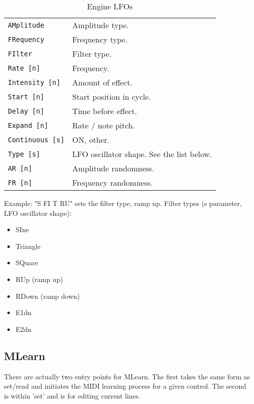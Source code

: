    \begin{table}[H]
      \centering
      \caption{Engine LFOs}
      \label{table:yoshimi_engine_lfos}
      \begin{tabular}{l l}

\texttt{AMplitude} &
   Amplitude type. \\
\texttt{FRequency} &
   Frequency type. \\
\texttt{FIlter} &
   Filter type. \\
\texttt{Rate [n]} &
   Frequency. \\
\texttt{Intensity [n]} &
   Amount of effect. \\
\texttt{Start [n]} &
   Start position in cycle. \\
\texttt{Delay [n]} &
   Time before effect. \\
\texttt{Expand [n]} &
   Rate / note pitch. \\
\texttt{Continuous [s]} &
   ON, other. \\
\texttt{Type [s]} &
   LFO oscillator shape. See the list below. \\
\texttt{AR [n]} &
   Amplitude randomness. \\
\texttt{FR [n]} &
   Frequency randomness. \\

      \end{tabular}
   \end{table}

Example: "S FI T RU" sets the filter type, ramp up.
Filter types (s parameter, LFO oscillator shape):

   \begin{itemize}
      \item SIne
      \item Triangle
      \item SQuare
      \item RUp (ramp up)
      \item RDown (ramp down)
      \item E1dn
      \item E2dn
   \end{itemize}

\subsection{MLearn}
\label{subsec:command_line_mlearn}
   There are actually two entry points for MLearn. The first takes the same form
   as set/read and initiates the MIDI learning process for a given control.
   The second is within 'set' and is for editing current lines.

